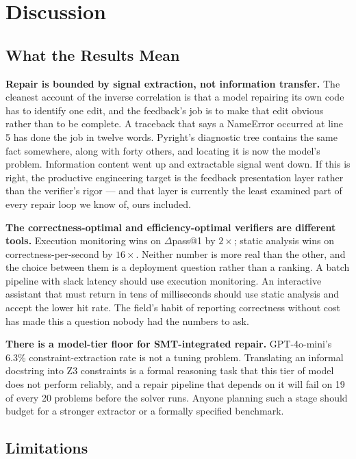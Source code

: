 \section{Discussion}

\subsection{What the Results Mean}

\textbf{Repair is bounded by signal extraction, not information transfer.} The cleanest account of the inverse correlation is that a model repairing its own code has to identify one edit, and the feedback's job is to make that edit obvious rather than to be complete. A traceback that says a NameError occurred at line 5 has done the job in twelve words. Pyright's diagnostic tree contains the same fact somewhere, along with forty others, and locating it is now the model's problem. Information content went up and extractable signal went down. If this is right, the productive engineering target is the feedback presentation layer rather than the verifier's rigor --- and that layer is currently the least examined part of every repair loop we know of, ours included.

\textbf{The correctness-optimal and efficiency-optimal verifiers are different tools.} Execution monitoring wins on $\Delta$pass@1 by $2\times$; static analysis wins on correctness-per-second by $16\times$. Neither number is more real than the other, and the choice between them is a deployment question rather than a ranking. A batch pipeline with slack latency should use execution monitoring. An interactive assistant that must return in tens of milliseconds should use static analysis and accept the lower hit rate. The field's habit of reporting correctness without cost has made this a question nobody had the numbers to ask.

\textbf{There is a model-tier floor for SMT-integrated repair.} GPT-4o-mini's 6.3\% constraint-extraction rate is not a tuning problem. Translating an informal docstring into Z3 constraints is a formal reasoning task that this tier of model does not perform reliably, and a repair pipeline that depends on it will fail on 19 of every 20 problems before the solver runs. Anyone planning such a stage should budget for a stronger extractor or a formally specified benchmark.

\subsection{Limitations}

